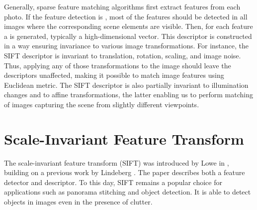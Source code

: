 Generally, sparse feature matching algorithms first extract features from each photo. %
If the feature detection is , most of the features should be detected in all images where the corresponding scene elements are visible.
Then, for each feature a  is generated, typically a high-dimensional vector. 
This descriptor is constructed in a way ensuring invariance to various image transformations. 
For instance, the SIFT descriptor is invariant to translation, rotation, scaling, and image noise. 
Thus, applying any of those transformations to the image should leave the descriptors unaffected, making it possible to match image features using Euclidean metric. 
The SIFT descriptor is also partially invariant to illumination changes and to affine transformations, the latter enabling us to perform matching of images capturing the scene from slightly different viewpoints.
 
\section{Scale-Invariant Feature Transform}

The scale-invariant feature transform (SIFT) was introduced by Lowe in \cite{lowe1999}, building on a previous work by Lindeberg \cite{lindeberg1998}. 
The paper describes both a feature detector and descriptor. 
To this day, SIFT remains a popular choice for applications such as panorama stitching and object detection. 
It is able to detect objects in images even in the presence of clutter.

